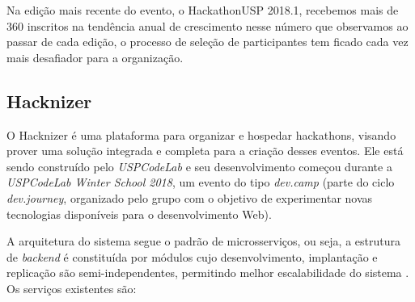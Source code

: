 \documentclass[10pt,twoside,a4paper]{article}
\begin{document}
        
    Na edição mais recente do evento, o HackathonUSP 2018.1, recebemos mais de 360 inscritos na tendência anual de crescimento nesse número que observamos ao passar de cada edição, o processo de seleção de participantes tem ficado cada vez mais desafiador para a organização.
    
  \subsection{Hacknizer}

    O Hacknizer é uma plataforma para organizar e hospedar hackathons, visando prover uma solução integrada e completa para a criação desses eventos. Ele está sendo construído pelo \textit{USPCodeLab} e seu desenvolvimento começou durante a \textit{USPCodeLab Winter School 2018}, um evento do tipo \textit{dev.camp} (parte do ciclo \textit{dev.journey}, organizado pelo grupo com o objetivo de experimentar novas tecnologias disponíveis para o desenvolvimento Web).
    
    A arquitetura do sistema segue o padrão de microsserviços, ou seja, a estrutura de \textit{backend} é constituída por módulos cujo desenvolvimento, implantação e replicação são semi-independentes, permitindo melhor escalabilidade do sistema \cite{Newman2015BuildingSystems}. Os serviços existentes são:
    
\end{document}
